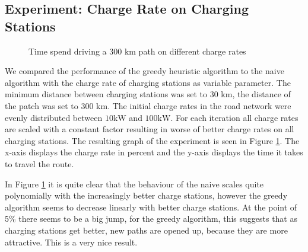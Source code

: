 \subsection{Experiment: Charge Rate on Charging Stations}

\begin{figure}
\centering
{}
\caption{Time spend driving a 300 km path on different charge rates} 
\label{fig:charge_rate}
\end{figure}

We compared the performance of the greedy heuristic algorithm to the naive algorithm with the charge rate of charging stations as variable parameter. The minimum distance between charging stations was set to 30 km, the distance of the patch was set to 300 km. The initial charge rates in the road network were evenly distributed between $10 \si{\kW}$ and $100 \si{\kW}$. For each iteration all charge rates are scaled with a constant factor resulting in worse of better charge rates on all charging stations. The resulting graph of the experiment is seen in Figure \ref{fig:charge_rate}. The x-axis displays the charge rate in percent and the y-axis displays the time it takes to travel the route.

In Figure \ref{fig:charge_rate} it is quite clear that the behaviour of the naive scales quite polynomially with the increasingly better charge stations, however the greedy algorithm seems to decrease linearly with better charge stations. At the point of 5\% there seems to be a big jump, for the greedy algorithm, this suggests that as charging stations get better, new paths are opened up, because they are more attractive. This is a very nice result. 